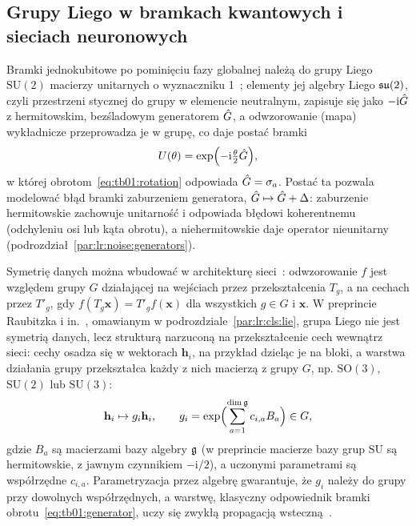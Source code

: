 \subsection{Grupy Liego w bramkach kwantowych i sieciach neuronowych}\label{subsec:tb:ml:lie}\label{subsec:tb:lie}

Bramki jednokubitowe po pominięciu fazy globalnej należą do grupy Liego $\mathrm{SU}(2)$ macierzy unitarnych o wyznaczniku 1~\cite{hall2015lie}; elementy jej algebry Liego $\mathfrak{su}(2)$, czyli przestrzeni stycznej do grupy w elemencie neutralnym, zapisuje się jako $-\mathrm{i}\hat{G}$ z hermitowskim, bezśladowym generatorem $\hat{G}$, a odwzorowanie (mapa) wykładnicze przeprowadza je w grupę, co daje postać bramki
\begin{equation}\label{eq:tb01:generator}
  U(\theta)=\exp\Bigl(-\mathrm{i}\tfrac{\theta}{2}\hat{G}\Bigr),
\end{equation}
w której obrotom~\eqref{eq:tb01:rotation} odpowiada $\hat{G}=\sigma_a$.
Postać ta pozwala modelować błąd bramki zaburzeniem generatora, $\hat{G}\mapsto\hat{G}+\Delta$: zaburzenie hermitowskie zachowuje unitarność i odpowiada błędowi koherentnemu (odchyleniu osi lub kąta obrotu), a niehermitowskie daje operator nieunitarny~\cite{raubitzek_quantum_noise} (podrozdział~\ref{par:lr:noise:generators}).

Symetrię danych można wbudować w architekturę sieci~\cite{bronstein2021geometric}: odwzorowanie $f$ jest  względem grupy $G$ działającej na wejściach przez przekształcenia $T_g$, a na cechach przez $T'_g$, gdy $f(T_g\mathbf{x})=T'_g f(\mathbf{x})$ dla wszystkich $g\in G$ i $\mathbf{x}$.
W preprincie Raubitzka i in.~\cite{raubitzek_lie_group_manuscript}, omawianym w podrozdziale~\ref{par:lr:cls:lie}, grupa Liego nie jest symetrią danych, lecz strukturą narzuconą na przekształcenie cech wewnątrz sieci: cechy osadza się w wektorach $\mathbf{h}_i$, na przykład dzieląc je na bloki, a warstwa działania grupy przekształca każdy z nich macierzą z grupy $G$, np. $\mathrm{SO}(3)$, $\mathrm{SU}(2)$ lub $\mathrm{SU}(3)$:
\begin{equation}\label{eq:tb:ml:lie}
\mathbf{h}_i\mapsto g_i\mathbf{h}_i,\qquad g_i=\exp\Bigl(\sum_{a=1}^{\dim\mathfrak{g}}c_{i,a}B_a\Bigr)\in G,
\end{equation}
gdzie $B_a$ są macierzami bazy algebry $\mathfrak{g}$ (w preprincie macierze bazy grup $\mathrm{SU}$ są hermitowskie, z jawnym czynnikiem $-\mathrm{i}/2$), a uczonymi parametrami są współrzędne $c_{i,a}$.
Parametryzacja przez algebrę gwarantuje, że $g_i$ należy do grupy przy dowolnych współrzędnych, a warstwę, klasyczny odpowiednik bramki obrotu~\eqref{eq:tb01:generator}, uczy się zwykłą propagacją wsteczną~\cite{raubitzek_lie_group_manuscript}.
